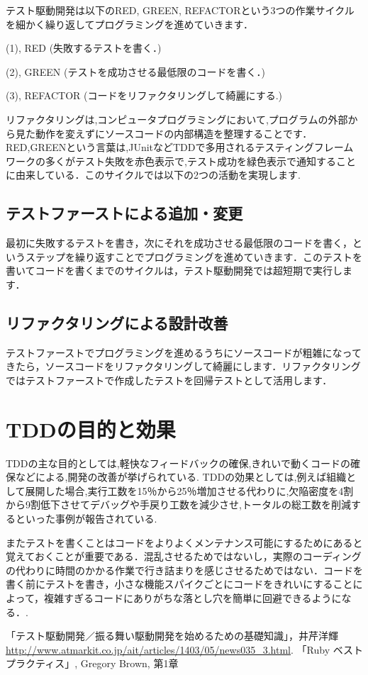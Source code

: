 \documentclass[a4j,twocolumn,uplatex]{jsarticle}
\begin{document}
テスト駆動開発は以下のRED, GREEN, REFACTORという3つの作業サイクルを細かく繰り返してプログラミングを進めていきます．

(1), RED  (失敗するテストを書く．)


(2), GREEN  (テストを成功させる最低限のコードを書く．)


(3), REFACTOR  (コードをリファクタリングして綺麗にする.)

リファクタリングは,コンピュータプログラミングにおいて,プログラムの外部から見た動作を変えずにソースコードの内部構造を整理することです．RED,GREENという言葉は,JUnitなどTDDで多用されるテスティングフレームワークの多くがテスト失敗を赤色表示で,テスト成功を緑色表示で通知することに由来している．このサイクルでは以下の2つの活動を実現します\cite{1}.


\subsection{テストファーストによる追加・変更}


最初に失敗するテストを書き，次にそれを成功させる最低限のコードを書く，というステップを繰り返すことでプログラミングを進めていきます．このテストを書いてコードを書くまでのサイクルは，テスト駆動開発では超短期で実行します．


\subsection{リファクタリングによる設計改善}


テストファーストでプログラミングを進めるうちにソースコードが粗雑になってきたら，ソースコードをリファクタリングして綺麗にします．リファクタリングではテストファーストで作成したテストを回帰テストとして活用します．

\section{TDDの目的と効果}
TDDの主な目的としては,軽快なフィードバックの確保,きれいで動くコードの確保などによる,開発の改善が挙げられている. TDDの効果としては,例えば組織として展開した場合,実行工数を15％から25％増加させる代わりに,欠陥密度を4割から9割低下させてデバッグや手戻り工数を減少させ,トータルの総工数を削減するといった事例が報告されている\cite{1}.

またテストを書くことはコードをよりよくメンテナンス可能にするためにあると覚えておくことが重要である．混乱させるためではないし，実際のコーディングの代わりに時間のかかる作業で行き詰まりを感じさせるためではない．コードを書く前にテストを書き，小さな機能スパイクごとにコードをきれいにすることによって，複雑すぎるコードにありがちな落とし穴を簡単に回避できるようになる．\cite{2}.


\begin{flushleft}
\begin{thebibliography}{9}
「テスト駆動開発／振る舞い駆動開発を始めるための基礎知識」，井芹洋輝 \url{http://www.atmarkit.co.jp/ait/articles/1403/05/news035_3.html}.
 「Ruby ベストプラクティス」, Gregory Brown, 第1章
\end{thebibliography}
\end{flushleft}
\end{document}
